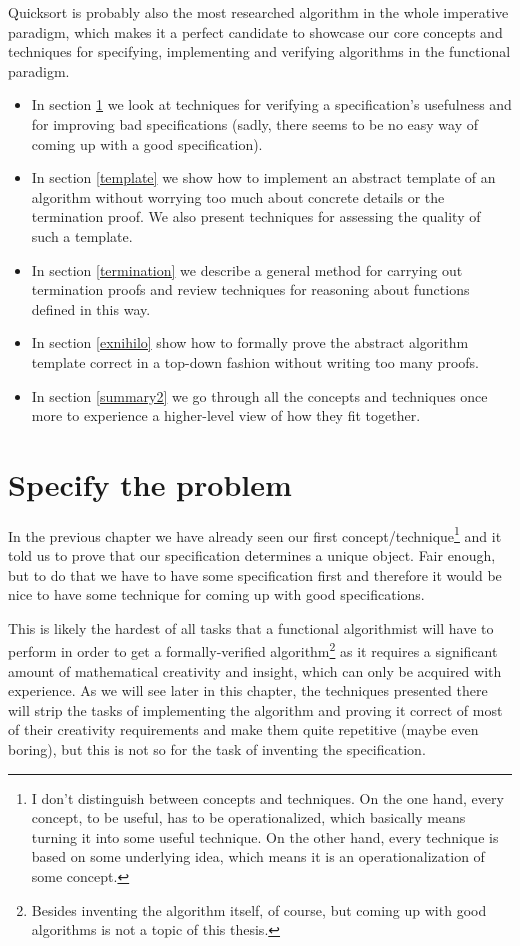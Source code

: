 \documentclass[declaration,mgr,english,shortabstract]{iithesis}
\begin{document}
Quicksort is probably also the most researched algorithm in the whole imperative paradigm, which makes it a perfect candidate to showcase our core concepts and techniques for specifying, implementing and verifying algorithms in the functional paradigm.

\begin{itemize}
    \item In section \ref{specify} we look at techniques for verifying a specification's usefulness and for improving bad specifications (sadly, there seems to be no easy way of coming up with a good specification).
    \item In section \ref{template} we show how to implement an abstract template of an algorithm without worrying too much about concrete details or the termination proof. We also present techniques for assessing the quality of such a template.
    \item In section \ref{termination} we describe a general method for carrying out termination proofs and review techniques for reasoning about functions defined in this way.
    \item In section \ref{exnihilo} show how to formally prove the abstract algorithm template correct in a top-down fashion without writing too many proofs.
    \item In section \ref{summary2} we go through all the concepts and techniques once more to experience a higher-level view of how they fit together.
\end{itemize}

\section{Specify the problem} \label{specify}

In the previous chapter we have already seen our first concept/technique\footnote{I don't distinguish between concepts and techniques. On the one hand, every concept, to be useful, has to be operationalized, which basically means turning it into some useful technique. On the other hand, every technique is based on some underlying idea, which means it is an operationalization of some concept.} and it told us to prove that our specification determines a unique object. Fair enough, but to do that we have to have some specification first and therefore it would be nice to have some technique for coming up with good specifications.

This is likely the hardest of all tasks that a functional algorithmist will have to perform in order to get a formally-verified algorithm\footnote{Besides inventing the algorithm itself, of course, but coming up with good algorithms is not a topic of this thesis.} as it requires a significant amount of mathematical creativity and insight, which can only be acquired with experience. As we will see later in this chapter, the techniques presented there will strip the tasks of implementing the algorithm and proving it correct of most of their creativity requirements and make them quite repetitive (maybe even boring), but this is not so for the task of inventing the specification.
\end{document}
